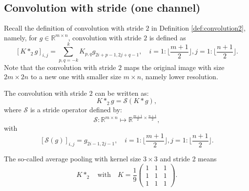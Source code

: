 \subsection{Convolution with stride (one channel)}
Recall the definition  of convolution with stride $2$ in Definition \ref{def:convolution2}, namely,
for $g \in \mathbb{R}^{m\times n}$, convolution with stride $2$ is defined as 
\begin{equation}\label{stride_2}
[K \ast_2 g]_{i,j} = \sum_{p,q=-k}^k K_{p,q} g_{2i + p-1, 2j + q-1},  
\quad i = 1: \lfloor \frac{m+1}{2}\rfloor , j = 1: \lfloor \frac{n+1}{2} \rfloor.
\end{equation} 
Note that the convolution with stride $2$ maps the original image with size $2m\times 2n$ to a new one with smaller size $m\times n$, namely lower resolution.
\begin{lemma}
The convolution with stride $2$ can be written as:
\begin{equation}\label{eq:convstride_2_1}
K \ast_2 g = \mathcal S( K\ast g),
\end{equation}
where $\mathcal S$ is a stride operator defined by:
\begin{equation}\label{eq:strideopdim}
\mathcal S: \mathbb{R}^{m \times n} \mapsto \mathbb{R}^{\frac{m+1}{2} \times \frac{n+1}{2}},
\end{equation}
with
\begin{equation}\label{eq:strideop}
[\mathcal S(g)]_{i,j} = g_{2i-1, 2j-1}, \quad i = 1: \lfloor \frac{m+1}{2}\rfloor , j = 1: \lfloor \frac{n+1}{2} \rfloor.
\end{equation}
\end{lemma}


\begin{example}
The so-called average pooling with kernel size $3 \times 3$ and stride 2 means
\begin{equation}
K \ast_2\quad \mbox{with}\quad
K = \frac{1}{9} 
\begin{pmatrix}
1 & 1 & 1 \\
1 & 1 & 1 \\
1 & 1 & 1
\end{pmatrix}.
\end{equation}
\end{example}







